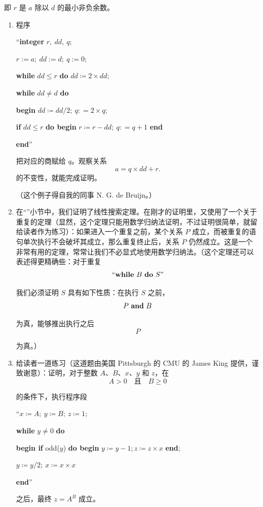 \noindent
即 $r$ 是 $a$ 除以 $d$ 的最小非负余数。

\begin{enumerate}[wide, nosep, label=\textit{说明 }\arabic*.]
	\item 程序
	
	{
		\setlength{\parindent}{8em}
		\hspace{-.4em}``\textbf{integer} $r,\ dd,\ q;$
		
		$r:= a;\ dd:= d;\ q:= 0;$
		
		\textbf{while} $dd \leqslant r$ \textbf{do} $dd \coloneq 2 \times dd;$
		
		\textbf{while} $dd \neq d$ \textbf{do}
		
		\quad\textbf{begin} $dd \coloneq dd/2;\ q: = 2 \times q;$
		
		\quad\quad\textbf{if} $dd \leqslant r$ \textbf{do begin} $r \coloneq r - dd;\ q: = q + 1$ \textbf{end}
		
		\quad\textbf{end}''
	}
	
\noindent
把对应的商赋给 $q$。观察关系
	$$
	a= q \times dd + r.
	$$
	的不变性，就能完成证明。
	
	（这个例子得自我的同事 N. G. de Bruijn。）

	\item 在“”小节中，我们证明了线性搜索定理。在刚才的证明里，又使用了一个关于重复的定理（显然，这个定理只能用数学归纳法证明，不过证明很简单，就留给读者作为练习）：如果进入一个重复之前，某个关系 $P$ 成立，而被重复的语句单次执行不会破坏其成立，那么重复终止后，关系 $P$ 仍然成立。这是一个非常有用的定理，常常让我们不必显式地使用数学归纳法。（这个定理还可以表述得更精确些：对于重复
	$$
		\text{``\textbf{while} } B \text{ \textbf{do} } S\text{''}
	$$
	
	\noindent
	我们必须证明 $S$ 具有如下性质：在执行 $S$ 之前，
	$$
	P \text{ \textbf{and} } B
	$$
	
	\noindent
	为真，能够推出执行之后
	$$ P $$
	
	\noindent
	为真。）
	\item 给读者一道练习（这道题由美国 Pittsburgh 的 CMU 的 James King 提供，谨致谢意）：证明，对于整数 $A$、$B$、$x$、$y$ 和 $z$，在
	$$
	A > 0\quad \text{且}\quad B\geqslant 0
	$$
	
	\noindent
	的条件下，执行程序段
	
	{
		\setlength{\parindent}{8em}
		\hspace{-.4em}``$x \coloneq A;\ y \coloneq B;\ z \coloneq 1;$
		
		\textbf{while} $y \neq 0$ \textbf{do}
		
		\quad\textbf{begin if} odd($y$) \textbf{do begin} $y \coloneq y - 1; z \coloneq z \times x$ \textbf{end};
		
		\quad\quad $y \coloneq y/2;\ x \coloneq x \times x$
		
		\quad\textbf{end}''
	}
	
	\noindent
	之后，最终 $z = A^B$ 成立。
\end{enumerate}

